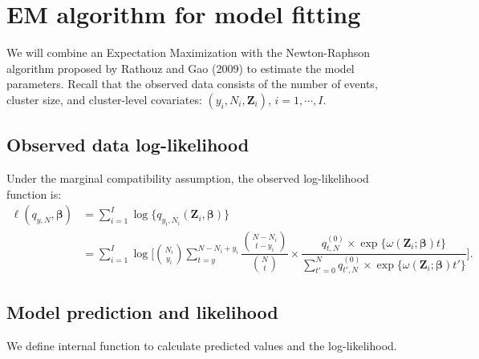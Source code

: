\documentclass[reqno]{amsart}
\begin{document}
\section{EM algorithm for model fitting}
We will combine an Expectation Maximization with the Newton-Raphson algorithm proposed by Rathouz and Gao (2009) to estimate the model parameters. Recall that the observed data consists of the number of events, cluster size, and cluster-level covariates: $(y_i, N_i, \boldsymbol{Z}_i)$, $i=1,\cdots,I$. 

\subsection{Observed data log-likelihood}
Under the marginal compatibility assumption, the observed log-likelihood function is:
\begin{equation}\label{E:loglikelihood}
\begin{split}
    \ell (q_{y,N}, \boldsymbol{\beta}) &= \sum_{i=1}^I \log \{ q_{y_i,N_i} (\boldsymbol{Z}_i, \boldsymbol{\beta}) \} \\
    &= \sum_{i=1}^I \log \bigg[ \binom{N_i}{y_i} \sum_{t=y}^{N-N_i+y_i} \dfrac{\binom{N-N_i}{t-y_i}}{\binom{N}{t}} \times \dfrac{q_{t,N}^{(0)} \times \exp \{ \omega(\boldsymbol{Z}_i; \boldsymbol{\beta}) t \}} {\sum_{t'=0}^{N} q_{t',N}^{(0)} \times \exp \{ \omega(\boldsymbol{Z}_i; \boldsymbol{\beta}) t' \}}  \bigg].
\end{split}
\end{equation}

\subsection{Model prediction and likelihood}
We define internal function to calculate predicted values and the log-likelihood.
\end{document}
